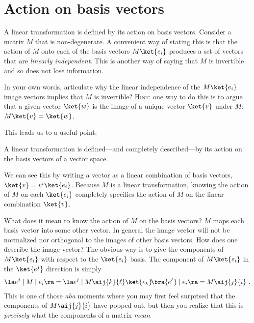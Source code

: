 \section{Action on basis vectors}

A linear transformation is defined by its action on basis vectors. Consider a matrix $M$ that is non-degenerate. A convenient way of stating this is that the action of $M$ onto each of the basis vectors $M\ket{e_i}$ produces a set of vectors that are \emph{linearly independent}. This is another way of saying that $M$ is invertible and so does not lose information. 
\begin{exercise}
In your own words, articulate why the linear independence of the $M\ket{e_i}$ image vectors implies that $M$ is invertible? \textsc{Hint}: one way to do this is to argue that a given vector $\ket{w}$ is the image of a unique vector $\ket{v}$ under $M$: $M\ket{v} = \ket{w}$.
\end{exercise}

This leads us to a useful point:
\begin{bigidea}
A linear transformation is defined---and completely described---by its action on the basis vectors of a vector space.
\end{bigidea}
We can see this by writing a vector as a linear combination of basis vectors, $\ket{v} = v^i\ket{e_i}$. Because $M$ is a linear transformation, knowing the action of $M$ on each $\ket{e_i}$ completely specifies the action of $M$ on the linear combination $\ket{v}$. 

What does it mean to know the action of $M$ on the basis vectors? $M$ maps each basis vector into some other vector. In general the image vector will not be normalized nor orthogonal to the images of other basis vectors. How does one describe the image vector? The obvious way is to give the components of $M\ket{e_i}$ with respect to the $\ket{e_i}$ basis. The component of $M\ket{e_i}$ in the $\ket{e^j}$ direction is simply
\begin{align}
    \la e^j \mid M \mid e_i \ra 
    = 
    \la e^j \mid M\aij{k}{\ell}\ket{e_k}\!\bra{e^\ell} \mid e_i \ra 
    = M\aij{j}{i} \ .
\end{align}
This is one of those \emph{aha} moments where you may first feel surprised that the components of $M\aij{j}{i}$ have popped out, but then you realize that this is \emph{precisely} what the components of a matrix \emph{mean}. 

